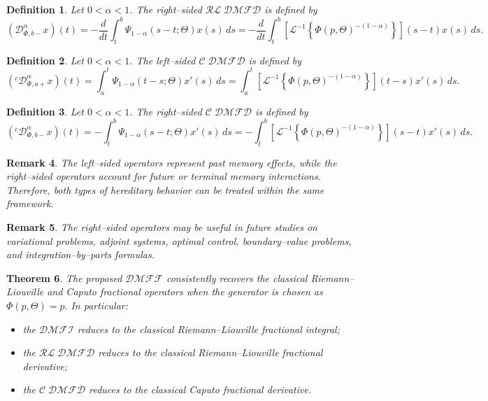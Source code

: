 \documentclass[11pt]{article}
\numberwithin{equation}{section}
\newtheorem{definition}{Definition}[section]
\newtheorem{theorem}[definition]{Theorem}
\newtheorem{remark}[definition]{Remark}
\begin{document}
\begin{definition}
Let \(0<\alpha<1\). The right--sided $\mathcal{RL\;DMFD}$ is defined by
\[
(\mathcal D^{\alpha}_{\Phi,b-}x)(t)
=
-
\frac{d}{dt}
\int_{t}^{b}
\Psi_{1-\alpha}(s-t;\Theta)x(s)\,ds
=
-
\frac{d}{dt}
\int_t^b
\left[
\mathcal L^{-1}
\left\{
\Phi(p,\Theta)^{-(1-\alpha)}
\right\}
\right](s-t)
x(s)\,ds.
\]
\end{definition}


\begin{definition}
Let \(0<\alpha<1\). The left--sided $\mathcal{C\;DMFD}$ is defined by
\[
({}^{c}\mathcal D^{\alpha}_{\Phi,a+}x)(t)
=
\int_{a}^{t}
\Psi_{1-\alpha}(t-s;\Theta)x'(s)\,ds
=
\int_a^t
\left[
\mathcal L^{-1}
\left\{
\Phi(p,\Theta)^{-(1-\alpha)}
\right\}
\right](t-s)
x'(s)\,ds.
\]
\end{definition}

\begin{definition}
Let \(0<\alpha<1\). The right--sided $\mathcal{C\;DMFD}$ is defined by
\[
({}^{c}\mathcal D^{\alpha}_{\Phi,b-}x)(t)
=
-
\int_{t}^{b}
\Psi_{1-\alpha}(s-t;\Theta)x'(s)\,ds
=
-
\int_t^b
\left[
\mathcal L^{-1}
\left\{
\Phi(p,\Theta)^{-(1-\alpha)}
\right\}
\right](s-t)
x'(s)\,ds.
\]
\end{definition}






\begin{remark}
The left--sided operators represent past memory effects, while the right--sided operators account for future or terminal memory interactions. Therefore, both types of hereditary behavior can be treated within the same framework.
\end{remark}


\begin{remark}
The right--sided operators may be useful in future studies on variational problems, adjoint systems, optimal control, boundary--value problems, and integration--by--parts formulas.
\end{remark}

\begin{theorem}
The proposed $\mathcal{DMFF}$ consistently recovers the classical Riemann--Liouville and Caputo fractional operators when the generator is chosen as
\(
\Phi(p,\Theta)=p.
\)
In particular:
\begin{itemize}
\item the $\mathcal{DMFI}$ reduces to the classical Riemann--Liouville fractional integral;
\item the $\mathcal{RL\;DMFD}$ reduces to the classical Riemann--Liouville fractional derivative;
\item the $\mathcal{C\;DMFD}$ reduces to the classical Caputo fractional derivative.
\end{itemize}
\end{theorem}
\end{document}
